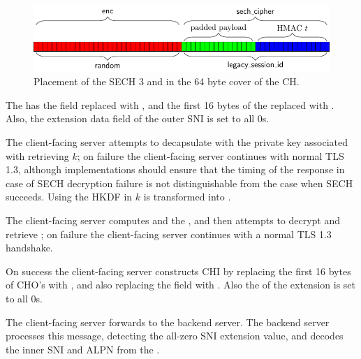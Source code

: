 \begin{figure}[H]
\centering
\includegraphics[width=\linewidth]{figure/sech5-cover.pdf}
\captionsetup{width=.8\linewidth} 
\caption[SECH 3 Cover]{Placement of the \ac{SECH} 3  and  in the 64 byte cover of the \ac{CH}.}
\label{fig:sech5-cover}
\end{figure}

The  has the  field replaced with \varsechinnerrandom{}, and the first 16 bytes of the
\varlegacysessionid{} replaced with .
Also, the extension data field of the outer \ac{SNI} is set to all 0s.

The client-facing server attempts to decapsulate  with the private key associated with  retrieving $k$; on failure 
the client-facing server continues with normal TLS 1.3,
although implementations should ensure that the timing of the response in case of \ac{SECH}
decryption failure is not distinguishable from the case when
\ac{SECH} succeeds.
Using the \ac{HKDF} in  $k$ is transformed into \varsechinnerrandom{}.


The client-facing server computes  and the \nonce, and then attempts to decrypt and retrieve ; on failure  
the client-facing server continues with a normal TLS 1.3 handshake.

On success the client-facing server constructs \ac{CHI} by replacing 
the first 16 bytes of \ac{CHO}'s 
with , and also replacing the  field
with .
Also the  of the  extension is set to all 0s.

The client-facing server forwards  to the backend server.
The backend server processes this message, detecting the all-zero \ac{SNI} extension value,
and decodes the inner \ac{SNI} and \ac{ALPN} from the \varlegacysessionid{}.

